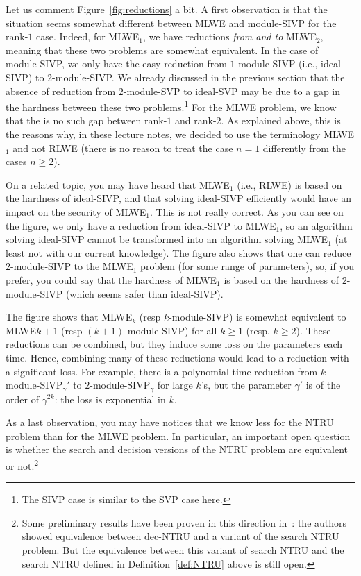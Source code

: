 Let us comment Figure~\ref{fig:reductions} a bit. A first observation is that the situation seems somewhat different between MLWE and module-SIVP for the rank-$1$ case. Indeed, for MLWE$_1$, we have reductions \emph{from and to} MLWE$_2$, meaning that these two problems are somewhat equivalent. In the case of module-SIVP, we only have the easy reduction from $1$-module-SIVP (i.e., ideal-SIVP) to $2$-module-SIVP. We already discussed in the previous section that the absence of reduction from $2$-module-SVP to ideal-SVP may be due to a gap in the hardness between these two problems.\footnote{The SIVP case is similar to the SVP case here.} For the MLWE problem, we know that the is no such gap between rank-$1$ and rank-$2$. As explained above, this is the reasons why, in these lecture notes, we decided to use the terminology MLWE$_1$ and not RLWE (there is no reason to treat the case $n = 1$ differently from the cases $n \geq 2$).

On a related topic, you may have heard that MLWE$_1$ (i.e., RLWE) is based on the hardness of ideal-SIVP, and that solving ideal-SIVP efficiently would have an impact on the security of MLWE$_1$. This is not really correct. As you can see on the figure, we only have a reduction from ideal-SIVP to MLWE$_1$, so an algorithm solving ideal-SIVP cannot be transformed into an algorithm solving MLWE$_1$ (at least not with our current knowledge). The figure also shows that one can reduce $2$-module-SIVP to the MLWE$_1$ problem (for some range of parameters), so, if you prefer, you could say that the hardness of MLWE$_1$ is based on the hardness of $2$-module-SIVP (which seems safer than ideal-SIVP).

The figure shows that MLWE$_k$ (resp $k$-module-SIVP) is somewhat equivalent to MLWE${k+1}$ (resp $(k+1)$-module-SIVP) for all $k \geq 1$ (resp. $k \geq 2$). These reductions can be combined, but they induce some loss on the parameters each time. Hence, combining many of these reductions would lead to a reduction with a significant loss. For example, there is a polynomial time reduction from $k$-module-SIVP$_\gamma'$ to $2$-module-SIVP$_\gamma$ for large $k$'s, but the parameter $\gamma'$ is of the order of $\gamma^{2k}$: the loss is exponential in $k$.

As a last observation, you may have notices that we know less for the NTRU problem than for the MLWE problem. In particular, an important open question is whether the search and decision versions of the NTRU problem are equivalent or not.\footnote{Some preliminary results have been proven in this direction in~\cite{PS21}: the authors showed equivalence between dec-NTRU and a variant of the search NTRU problem. But the equivalence between this variant of search NTRU and the search NTRU defined in Definition~\ref{def:NTRU} above is still open.}

